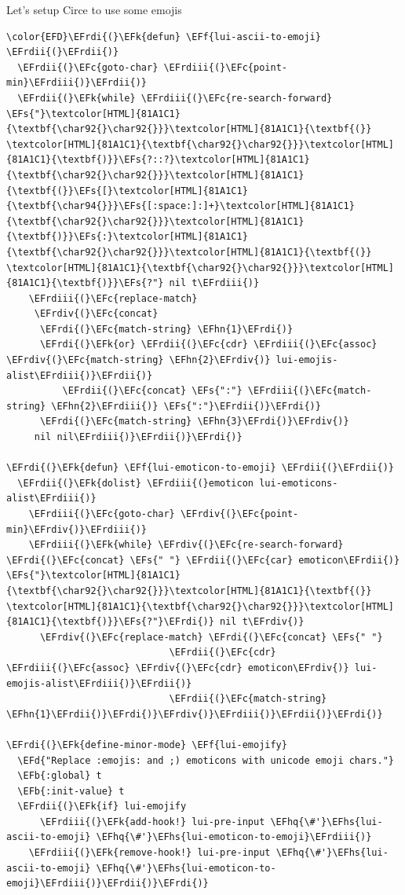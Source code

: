 \documentclass{scrartcl}
\newcommand{\EFk}[1]{\textcolor{EFk}{#1}} %
\newcommand{\EFd}[1]{\textcolor{EFd}{#1}} %
\newcommand{\EFs}[1]{\textcolor{EFs}{#1}} %
\newcommand{\EFb}[1]{\textcolor{EFb}{#1}} %
\newcommand{\EFc}[1]{\textcolor{EFc}{#1}} %
\newcommand{\EFf}[1]{\textcolor{EFf}{#1}} %
\newcommand{\EFhn}[1]{#1} %
\newcommand{\EFhq}[1]{#1} %
\newcommand{\EFhs}[1]{#1} %
\newcommand{\EFrdi}[1]{#1} %
\newcommand{\EFrdii}[1]{#1} %
\newcommand{\EFrdiii}[1]{#1} %
\newcommand{\EFrdiv}[1]{#1} %
\begin{document}
Let's setup Circe to use some emojis
\begin{Code}
\begin{Verbatim}[]
\color{EFD}\EFrdi{(}\EFk{defun} \EFf{lui-ascii-to-emoji} \EFrdii{(}\EFrdii{)}
  \EFrdii{(}\EFc{goto-char} \EFrdiii{(}\EFc{point-min}\EFrdiii{)}\EFrdii{)}
  \EFrdii{(}\EFk{while} \EFrdiii{(}\EFc{re-search-forward} \EFs{"}\textcolor[HTML]{81A1C1}{\textbf{\char92{}\char92{}}}\textcolor[HTML]{81A1C1}{\textbf{(}} \textcolor[HTML]{81A1C1}{\textbf{\char92{}\char92{}}}\textcolor[HTML]{81A1C1}{\textbf{)}}\EFs{?::?}\textcolor[HTML]{81A1C1}{\textbf{\char92{}\char92{}}}\textcolor[HTML]{81A1C1}{\textbf{(}}\EFs{[}\textcolor[HTML]{81A1C1}{\textbf{\char94{}}}\EFs{[:space:]:]+}\textcolor[HTML]{81A1C1}{\textbf{\char92{}\char92{}}}\textcolor[HTML]{81A1C1}{\textbf{)}}\EFs{:}\textcolor[HTML]{81A1C1}{\textbf{\char92{}\char92{}}}\textcolor[HTML]{81A1C1}{\textbf{(}} \textcolor[HTML]{81A1C1}{\textbf{\char92{}\char92{}}}\textcolor[HTML]{81A1C1}{\textbf{)}}\EFs{?"} nil t\EFrdiii{)}
    \EFrdiii{(}\EFc{replace-match}
     \EFrdiv{(}\EFc{concat}
      \EFrdi{(}\EFc{match-string} \EFhn{1}\EFrdi{)}
      \EFrdi{(}\EFk{or} \EFrdii{(}\EFc{cdr} \EFrdiii{(}\EFc{assoc} \EFrdiv{(}\EFc{match-string} \EFhn{2}\EFrdiv{)} lui-emojis-alist\EFrdiii{)}\EFrdii{)}
          \EFrdii{(}\EFc{concat} \EFs{":"} \EFrdiii{(}\EFc{match-string} \EFhn{2}\EFrdiii{)} \EFs{":"}\EFrdii{)}\EFrdi{)}
      \EFrdi{(}\EFc{match-string} \EFhn{3}\EFrdi{)}\EFrdiv{)}
     nil nil\EFrdiii{)}\EFrdii{)}\EFrdi{)}

\EFrdi{(}\EFk{defun} \EFf{lui-emoticon-to-emoji} \EFrdii{(}\EFrdii{)}
  \EFrdii{(}\EFk{dolist} \EFrdiii{(}emoticon lui-emoticons-alist\EFrdiii{)}
    \EFrdiii{(}\EFc{goto-char} \EFrdiv{(}\EFc{point-min}\EFrdiv{)}\EFrdiii{)}
    \EFrdiii{(}\EFk{while} \EFrdiv{(}\EFc{re-search-forward} \EFrdi{(}\EFc{concat} \EFs{" "} \EFrdii{(}\EFc{car} emoticon\EFrdii{)} \EFs{"}\textcolor[HTML]{81A1C1}{\textbf{\char92{}\char92{}}}\textcolor[HTML]{81A1C1}{\textbf{(}} \textcolor[HTML]{81A1C1}{\textbf{\char92{}\char92{}}}\textcolor[HTML]{81A1C1}{\textbf{)}}\EFs{?"}\EFrdi{)} nil t\EFrdiv{)}
      \EFrdiv{(}\EFc{replace-match} \EFrdi{(}\EFc{concat} \EFs{" "}
                             \EFrdii{(}\EFc{cdr} \EFrdiii{(}\EFc{assoc} \EFrdiv{(}\EFc{cdr} emoticon\EFrdiv{)} lui-emojis-alist\EFrdiii{)}\EFrdii{)}
                             \EFrdii{(}\EFc{match-string} \EFhn{1}\EFrdii{)}\EFrdi{)}\EFrdiv{)}\EFrdiii{)}\EFrdii{)}\EFrdi{)}

\EFrdi{(}\EFk{define-minor-mode} \EFf{lui-emojify}
  \EFd{"Replace :emojis: and ;) emoticons with unicode emoji chars."}
  \EFb{:global} t
  \EFb{:init-value} t
  \EFrdii{(}\EFk{if} lui-emojify
      \EFrdiii{(}\EFk{add-hook!} lui-pre-input \EFhq{\#'}\EFhs{lui-ascii-to-emoji} \EFhq{\#'}\EFhs{lui-emoticon-to-emoji}\EFrdiii{)}
    \EFrdiii{(}\EFk{remove-hook!} lui-pre-input \EFhq{\#'}\EFhs{lui-ascii-to-emoji} \EFhq{\#'}\EFhs{lui-emoticon-to-emoji}\EFrdiii{)}\EFrdii{)}\EFrdi{)}
\end{Verbatim}
\end{Code}
\end{document}
